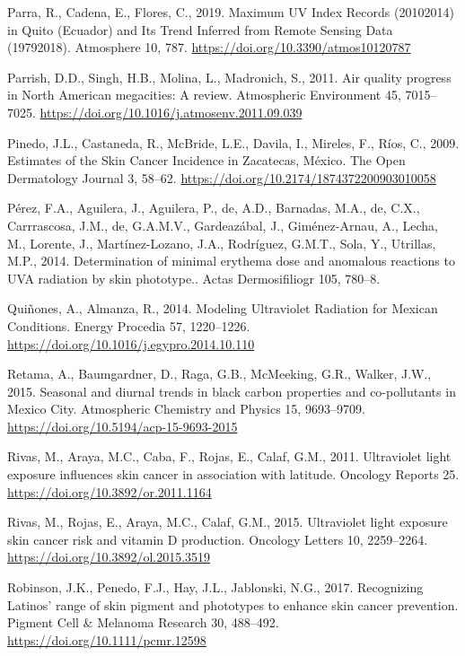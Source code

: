 \documentclass[10pt]{article}
\begin{document}
\label{csl:61}Parra, R., Cadena, E., Flores, C., 2019. {Maximum {UV} Index Records (2010{\textendash}2014) in Quito (Ecuador) and Its Trend Inferred from Remote Sensing Data (1979{\textendash}2018)}. Atmosphere 10, 787. \url{https://doi.org/10.3390/atmos10120787}

\label{csl:0}Parrish, D.D., Singh, H.B., Molina, L., Madronich, S., 2011. {Air quality progress in North American megacities: A review}. Atmospheric Environment 45, 7015–7025. \url{https://doi.org/10.1016/j.atmosenv.2011.09.039}

\label{csl:71}Pinedo, J.L., Castaneda, R., McBride, L.E., Davila, I., Mireles, F., Ríos, C., 2009. {Estimates of the Skin Cancer Incidence in Zacatecas, México}. The Open Dermatology Journal 3, 58–62. \url{https://doi.org/10.2174/1874372200903010058}

\label{csl:31}Pérez, F.A., Aguilera, J., Aguilera, P., de, A.D., Barnadas, M.A., de, C.X., Carrrascosa, J.M., de, G.A.M.V., Gardeazábal, J., Giménez-Arnau, A., Lecha, M., Lorente, J., Martínez-Lozano, J.A., Rodríguez, G.M.T., Sola, Y., Utrillas, M.P., 2014. {Determination of minimal erythema dose and anomalous reactions to UVA radiation by skin phototype.}. Actas Dermosifiliogr 105, 780–8.

\label{csl:16}Qui{\~{n}}ones, A., Almanza, R., 2014. {Modeling Ultraviolet Radiation for Mexican Conditions}. Energy Procedia 57, 1220–1226. \url{https://doi.org/10.1016/j.egypro.2014.10.110}

\label{csl:64}Retama, A., Baumgardner, D., Raga, G.B., McMeeking, G.R., Walker, J.W., 2015. {Seasonal and diurnal trends in black carbon properties and co-pollutants in Mexico City}. Atmospheric Chemistry and Physics 15, 9693–9709. \url{https://doi.org/10.5194/acp-15-9693-2015}

\label{csl:59}Rivas, M., Araya, M.C., Caba, F., Rojas, E., Calaf, G.M., 2011. {Ultraviolet light exposure influences skin cancer in association with latitude}. Oncology Reports 25. \url{https://doi.org/10.3892/or.2011.1164}

\label{csl:60}Rivas, M., Rojas, E., Araya, M.C., Calaf, G.M., 2015. {Ultraviolet light exposure skin cancer risk and vitamin D production}. Oncology Letters 10, 2259–2264. \url{https://doi.org/10.3892/ol.2015.3519}

\label{csl:43}Robinson, J.K., Penedo, F.J., Hay, J.L., Jablonski, N.G., 2017. {Recognizing Latinos' range of skin pigment and phototypes to enhance skin cancer prevention}. Pigment Cell {\&} Melanoma Research 30, 488–492. \url{https://doi.org/10.1111/pcmr.12598}
\end{document}
